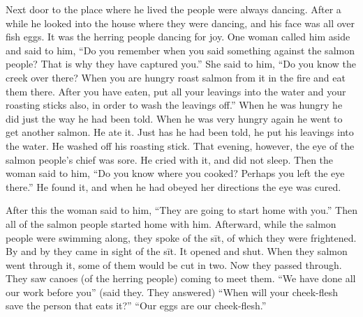 Next door to the place where he lived the people were always dancing.
After a while he looked into the house where they were dancing, and his face was all over fish eggs.
It was the herring people dancing for joy.
One woman called him aside and said to him, \qqk{}“Do you remember when you said something against the salmon people?
That is why they have captured you.” She said to him, \qqk{}“Do you know the creek over there?
When you are hungry roast salmon from it in the fire and eat them there.
After you have eaten, put all your leavings into the water and your roasting sticks also, in order to wash the leavings off.” When he was hungry he did just the way he had been told.
When he was very hungry again he went to get another salmon.
He ate it.
\!Just has he had been told, he put his leavings into the water.
He washed off his roasting stick.
That evening, however, the eye of the salmon people’s chief was sore.
He cried with it, and did not sleep.
Then the woman said to him, \qqk{}“Do you know where you cooked?
Perhaps you left the eye there.” He found it, and when he had obeyed her directions the eye was cured.

After this the woman said to him, \qqk{}“They are going to start home with you.” Then all of the salmon people started home with him.
Afterward, while the salmon people were swimming along, they spoke of the sīt, of which they were frightened.
By and by they came in sight of the sīt.
It opened and shut.
When they salmon went through it, some of them would be cut in two.
Now they passed through.
They saw canoes (of the herring people) coming to meet them.
\qqk{}“We have done all our work before you” (said they.
They answered) \qqk{}“When will your cheek-flesh save the person that eats it?” \qqk{}“Our eggs are our cheek-flesh.”


